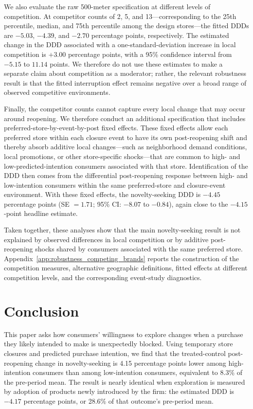 \documentclass[11 pt]{article}
\begin{document}
We also evaluate the raw 500-meter specification at different levels of competition. At competitor counts of 2, 5, and 13---corresponding to the 25th percentile, median, and 75th percentile among the design stores---the fitted DDDs are $-5.03$, $-4.39$, and $-2.70$ percentage points, respectively. The estimated change in the DDD associated with a one-standard-deviation increase in local competition is $+3.00$ percentage points, with a 95\% confidence interval from $-5.15$ to $11.14$ points. We therefore do not use these estimates to make a separate claim about competition as a moderator; rather, the relevant robustness result is that the fitted interruption effect remains negative over a broad range of observed competitive environments.

Finally, the competitor counts cannot capture every local change that may occur around reopening. We therefore conduct an additional specification that includes preferred-store-by-event-by-post fixed effects. These fixed effects allow each preferred store within each closure event to have its own post-reopening shift and thereby absorb additive local changes---such as neighborhood demand conditions, local promotions, or other store-specific shocks---that are common to high- and low-predicted-intention consumers associated with that store. Identification of the DDD then comes from the differential post-reopening response between high- and low-intention consumers within the same preferred-store and closure-event environment. With these fixed effects, the novelty-seeking DDD is $-4.45$ percentage points (SE $=1.71$; 95\% CI: $-8.07$ to $-0.84$), again close to the $-4.15$-point headline estimate.

Taken together, these analyses show that the main novelty-seeking result is not explained by observed differences in local competition or by additive post-reopening shocks shared by consumers associated with the same preferred store. Appendix~\ref{app:robustness_competing_brands} reports the construction of the competition measures, alternative geographic definitions, fitted effects at different competition levels, and the corresponding event-study diagnostics.


\section{Conclusion}
\label{section:7}

This paper asks how consumers' willingness to explore changes when a purchase they likely intended to make is unexpectedly blocked. Using temporary store closures and predicted purchase intention, we find that the treated-control post-reopening change in novelty-seeking is 4.15 percentage points lower among high-intention consumers than among low-intention consumers, equivalent to 8.3\% of the pre-period mean. The result is nearly identical when exploration is measured by adoption of products newly introduced by the firm: the estimated DDD is $-4.17$ percentage points, or 28.6\% of that outcome's pre-period mean.
\end{document}
